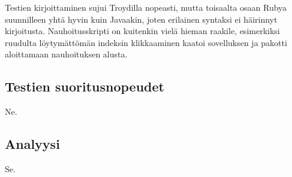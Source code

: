 Testien kirjoittaminen sujui Troydilla nopeasti, mutta toisaalta osaan Rubya suunnilleen yhtä hyvin kuin Javaakin, joten erilainen syntaksi ei häirinnyt kirjoitusta. Nauhoitusskripti on kuitenkin vielä hieman raakile, esimerkiksi ruudulta löytymättömän indeksin klikkaaminen kaatoi sovelluksen ja pakotti aloittamaan nauhoituksen alusta.

\subsection{Testien suoritusnopeudet}

Ne.

\subsection{Analyysi}

Se.